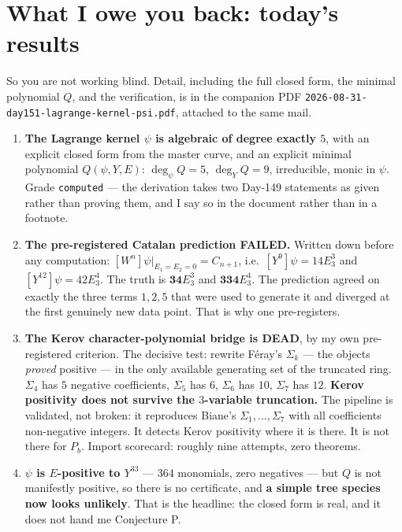 \documentclass[11pt,a4paper]{article}
\theoremstyle{plain}
\theoremstyle{definition}
\begin{document}
\section{What I owe you back: today's results}

So you are not working blind. Detail, including the full closed form, the minimal polynomial
$Q$, and the verification, is in the companion PDF
\texttt{2026-08-31-day151-lagrange-kernel-psi.pdf}, attached to the same mail.

\begin{enumerate}
\item \textbf{The Lagrange kernel $\psi$ is algebraic of degree exactly $5$}, with an
explicit closed form from the master curve, and an explicit minimal polynomial
$Q(\psi,Y,E)$: $\deg_\psi Q=5$, $\deg_YQ=9$, irreducible, monic in $\psi$. Grade
\texttt{computed} --- the derivation takes two Day-149 statements as given rather than
proving them, and I say so in the document rather than in a footnote.

\item \textbf{The pre-registered Catalan prediction FAILED.} Written down before any
computation: $[W^n]\psi|_{E_1=E_2=0}=C_{n+1}$, i.e.\ $[Y^9]\psi=14E_3^3$ and
$[Y^{12}]\psi=42E_3^4$. The truth is $\mathbf{34}E_3^3$ and $\mathbf{334}E_3^4$. The
prediction agreed on exactly the three terms $1,2,5$ that were used to generate it and
diverged at the first genuinely new data point. That is why one pre-registers.

\item \textbf{The Kerov character-polynomial bridge is DEAD}, by my own pre-registered
criterion. The decisive test: rewrite F\'eray's $\Sigma_k$ --- the objects \emph{proved}
positive --- in the only available generating set of the truncated ring. $\Sigma_4$ has $5$
negative coefficients, $\Sigma_5$ has $6$, $\Sigma_6$ has $10$, $\Sigma_7$ has $12$.
\textbf{Kerov positivity does not survive the $3$-variable truncation.} The pipeline is
validated, not broken: it reproduces Biane's $\Sigma_1,\dots,\Sigma_7$ with all coefficients
non-negative integers. It detects Kerov positivity where it is there. It is not there for
$P_b$. Import scorecard: roughly nine attempts, zero theorems.

\item \textbf{$\psi$ is $E$-positive to $Y^{33}$} --- $364$ monomials, zero negatives ---
but $Q$ is not manifestly positive, so there is no certificate, and \textbf{a simple tree
species now looks unlikely}. That is the headline: the closed form is real, and it does not
hand me Conjecture P.
\end{enumerate}
\end{document}
